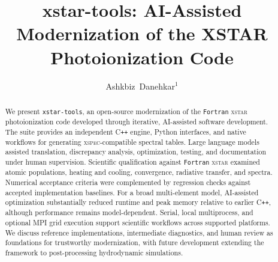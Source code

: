 \documentclass[11pt,twoside]{article}
\begin{document}
\title{xstar-tools: AI-Assisted Modernization of the XSTAR Photoionization Code}

\author{Ashkbiz~Danehkar$^1$}





\begin{abstract}
We present {\tt xstar-tools}, an open-source modernization of the \texttt{Fortran} \textsc{xstar} photoionization code developed through iterative, AI-assisted software development. The suite provides an independent C{}\texttt{++} engine, Python interfaces, and native workflows for generating \textsc{xspec}-compatible spectral tables. Large language models assisted translation, discrepancy analysis, optimization, testing, and documentation under human supervision. Scientific qualification against \texttt{Fortran} \textsc{xstar} examined atomic populations, heating and cooling, convergence, radiative transfer, and spectra. Numerical acceptance criteria were complemented by regression checks against accepted implementation baselines. For a broad multi-element model, AI-assisted optimization substantially reduced runtime and peak memory relative to earlier C{}\texttt{++}, although performance remains model-dependent. Serial, local multiprocess, and optional MPI grid execution support scientific workflows across supported platforms. We discuss reference implementations, intermediate diagnostics, and human review as foundations for trustworthy modernization, with future development extending the framework to post-processing hydrodynamic simulations.
\end{abstract}
\end{document}
